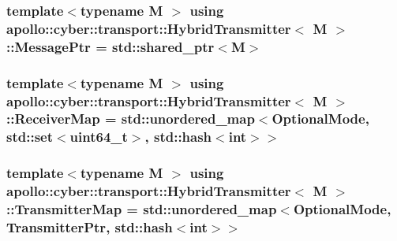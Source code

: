 \hypertarget{classapollo_1_1cyber_1_1transport_1_1HybridTransmitter_ae4da0fb39a90d084d271b8522afc0881}{
\subsubsection[{Message\-Ptr}]{\setlength{\rightskip}{0pt plus 5cm}template$<$typename M $>$ using {\bf apollo\-::cyber\-::transport\-::\-Hybrid\-Transmitter}$<$ M $>$\-::{\bf Message\-Ptr} =  std\-::shared\-\_\-ptr$<$M$>$}}\label{classapollo_1_1cyber_1_1transport_1_1HybridTransmitter_ae4da0fb39a90d084d271b8522afc0881}
\hypertarget{classapollo_1_1cyber_1_1transport_1_1HybridTransmitter_a57d8d230cedd2328577b9789ab964a5c}{
\subsubsection[{Receiver\-Map}]{\setlength{\rightskip}{0pt plus 5cm}template$<$typename M $>$ using {\bf apollo\-::cyber\-::transport\-::\-Hybrid\-Transmitter}$<$ M $>$\-::{\bf Receiver\-Map} =  std\-::unordered\-\_\-map$<$Optional\-Mode, std\-::set$<$uint64\-\_\-t$>$, std\-::hash$<$int$>$$>$}}\label{classapollo_1_1cyber_1_1transport_1_1HybridTransmitter_a57d8d230cedd2328577b9789ab964a5c}
\hypertarget{classapollo_1_1cyber_1_1transport_1_1HybridTransmitter_a79fe84264b152838a2a921ca7c428d31}{
\subsubsection[{Transmitter\-Map}]{\setlength{\rightskip}{0pt plus 5cm}template$<$typename M $>$ using {\bf apollo\-::cyber\-::transport\-::\-Hybrid\-Transmitter}$<$ M $>$\-::{\bf Transmitter\-Map} =  std\-::unordered\-\_\-map$<$Optional\-Mode, {\bf Transmitter\-Ptr}, std\-::hash$<$int$>$$>$}}\label{classapollo_1_1cyber_1_1transport_1_1HybridTransmitter_a79fe84264b152838a2a921ca7c428d31}
